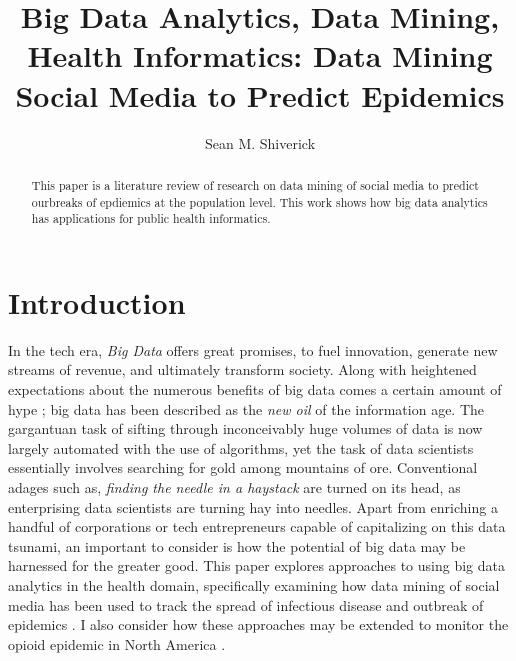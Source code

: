 \documentclass[sigconf]{acmart}
\begin{document}
\title{Big Data Analytics, Data Mining, Health Informatics: Data Mining Social Media to Predict Epidemics}
\author{Sean M. Shiverick}


\begin{abstract}
This paper is a literature review of research on data mining of social media to predict ourbreaks of epdiemics at the population level. This work shows how big data analytics has applications for public health informatics.
\end{abstract}



\maketitle

\section{Introduction}

In the tech era, \textit{Big Data} offers great promises, to fuel innovation, generate new streams of revenue, and ultimately transform society. Along with heightened expectations about the numerous benefits of big data comes a certain amount of hype \cite{gupta15}; big data has been described as the \textit{new oil} of the information age. The gargantuan task of sifting through inconceivably huge volumes of data is now largely automated with the use of algorithms, yet the task of data scientists essentially involves searching for gold among mountains of ore. Conventional adages such as, \textit{finding the needle in a haystack} are turned on its head, as enterprising data scientists are turning hay into needles. Apart from enriching a handful of corporations or tech entrepreneurs capable of capitalizing on this data tsunami, an important to consider is how the potential of big data may be harnessed for the greater good. This paper explores approaches to using big data analytics in the health domain, specifically examining how data mining of social media has been used to track the spread of infectious disease and outbreak of epidemics \cite{hay13}. I also consider how these approaches may be extended to monitor the opioid epidemic in North America \cite{volkow14}.
\end{document}
